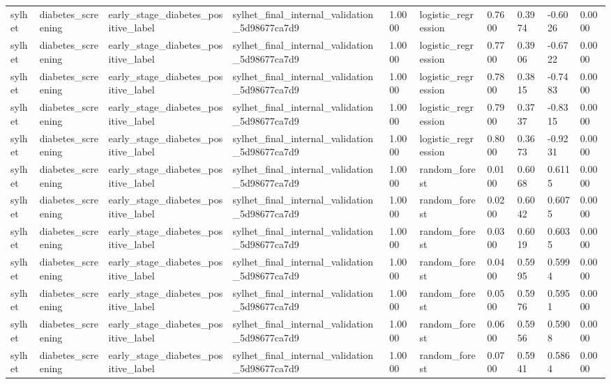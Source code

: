 \begin{tabular}{llllllllll}
sylhet & diabetes\_screening & early\_stage\_diabetes\_positive\_label & sylhet\_final\_internal\_validation\_5d98677ca7d9 & 1.0000 & logistic\_regression & 0.7600 & 0.3974 & -0.6026 & 0.0000 \\
sylhet & diabetes\_screening & early\_stage\_diabetes\_positive\_label & sylhet\_final\_internal\_validation\_5d98677ca7d9 & 1.0000 & logistic\_regression & 0.7700 & 0.3906 & -0.6722 & 0.0000 \\
sylhet & diabetes\_screening & early\_stage\_diabetes\_positive\_label & sylhet\_final\_internal\_validation\_5d98677ca7d9 & 1.0000 & logistic\_regression & 0.7800 & 0.3815 & -0.7483 & 0.0000 \\
sylhet & diabetes\_screening & early\_stage\_diabetes\_positive\_label & sylhet\_final\_internal\_validation\_5d98677ca7d9 & 1.0000 & logistic\_regression & 0.7900 & 0.3737 & -0.8315 & 0.0000 \\
sylhet & diabetes\_screening & early\_stage\_diabetes\_positive\_label & sylhet\_final\_internal\_validation\_5d98677ca7d9 & 1.0000 & logistic\_regression & 0.8000 & 0.3673 & -0.9231 & 0.0000 \\
sylhet & diabetes\_screening & early\_stage\_diabetes\_positive\_label & sylhet\_final\_internal\_validation\_5d98677ca7d9 & 1.0000 & random\_forest & 0.0100 & 0.6068 & 0.6115 & 0.0000 \\
sylhet & diabetes\_screening & early\_stage\_diabetes\_positive\_label & sylhet\_final\_internal\_validation\_5d98677ca7d9 & 1.0000 & random\_forest & 0.0200 & 0.6042 & 0.6075 & 0.0000 \\
sylhet & diabetes\_screening & early\_stage\_diabetes\_positive\_label & sylhet\_final\_internal\_validation\_5d98677ca7d9 & 1.0000 & random\_forest & 0.0300 & 0.6019 & 0.6035 & 0.0000 \\
sylhet & diabetes\_screening & early\_stage\_diabetes\_positive\_label & sylhet\_final\_internal\_validation\_5d98677ca7d9 & 1.0000 & random\_forest & 0.0400 & 0.5995 & 0.5994 & 0.0000 \\
sylhet & diabetes\_screening & early\_stage\_diabetes\_positive\_label & sylhet\_final\_internal\_validation\_5d98677ca7d9 & 1.0000 & random\_forest & 0.0500 & 0.5976 & 0.5951 & 0.0000 \\
sylhet & diabetes\_screening & early\_stage\_diabetes\_positive\_label & sylhet\_final\_internal\_validation\_5d98677ca7d9 & 1.0000 & random\_forest & 0.0600 & 0.5956 & 0.5908 & 0.0000 \\
sylhet & diabetes\_screening & early\_stage\_diabetes\_positive\_label & sylhet\_final\_internal\_validation\_5d98677ca7d9 & 1.0000 & random\_forest & 0.0700 & 0.5941 & 0.5864 & 0.0000 \\

\end{tabular}
